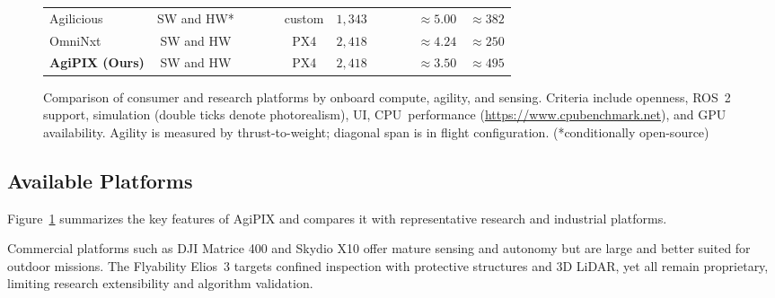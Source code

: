 \documentclass[letterpaper, 10 pt, conference]{ieeeconf}  %
\newcommand{\Agipixs}{AgiPIX }
\newcommand{\cmark}{\ding{51}}
\newcommand{\xmark}{\ding{55}}
\begin{document}
\begin{figure}[!ht]
{\begin{tabular}{@{}l|c|c|c|c|c|r|c|c|c|r|r}
        	Agilicious~\cite{Foehn2022Agilicious} & SW and HW* & \textcolor{red}{\xmark} & \textcolor{green}{\cmark}\textcolor{green}{\cmark} & \textcolor{green}{\cmark} & custom & $1{,}343$ & \textcolor{green}{\cmark} & \textcolor{red}{\xmark} & \textcolor{red}{\xmark} & $\approx5.00$ & $\approx382$  \\
            OmniNxt~\cite{liu2024omninxt} & SW and HW & \textcolor{green}{\cmark} & \textcolor{red}{\xmark} & \textcolor{green}{\cmark} & PX4 & $2{,}418$ & \textcolor{green}{\cmark} & \textcolor{red}{\xmark} & \textcolor{green}{\cmark} & $\approx4.24$  & $\approx250$  \\

                \midrule
        	\textbf{\Agipixs(Ours)} & SW and HW & \textcolor{green}{\cmark} & \textcolor{green}{\cmark}\textcolor{green}{\cmark} & \textcolor{green}{\cmark} & PX4 & $2{,}418$ & \textcolor{green}{\cmark} & \textcolor{green}{\cmark} & \textcolor{green}{\cmark}& $\approx3.50$ & $\approx495$ \\
        	\bottomrule
        \end{tabular}
        }
    \caption{
    Comparison of consumer and research platforms by onboard compute, agility, and sensing. Criteria include openness, ROS~2 support, simulation (double ticks denote photorealism), UI, CPU~performance ({\small\protect\url{https://www.cpubenchmark.net}}), and GPU availability. Agility is measured by thrust-to-weight; diagonal span is in flight configuration. (*conditionally open-source)
    }
    \label{fig:comparison}
    \vspace*{-12pt}
\end{figure}

%
%
\subsection{Available Platforms}\label{subsec:related.platforms}
Figure~\ref{fig:comparison} summarizes the key features of \Agipixs and compares it with representative research and industrial platforms.

Commercial platforms such as DJI Matrice 400 \cite{djiMatrice400Specs2026} and Skydio X10 \cite{skydioX102026} offer mature sensing and autonomy but are large and better suited for outdoor missions. The Flyability Elios~3 \cite{flyabilityElios32022} targets confined inspection with protective structures and 3D LiDAR, yet all remain proprietary, limiting research extensibility and algorithm validation.
\end{document}
